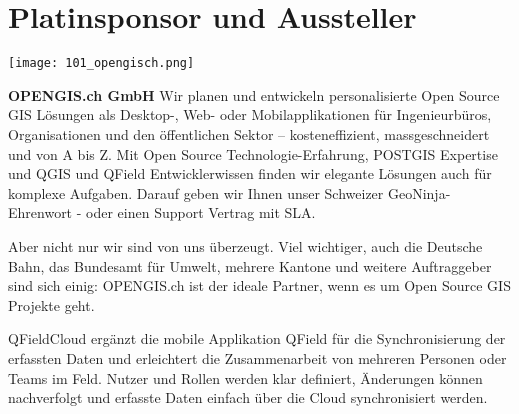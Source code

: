 \section*{Platinsponsor und Aussteller}
\begin{flushright}
\texttt{[image: 101\_opengisch.png]}
\end{flushright}
\noindent
{\bfseries OPENGIS.ch GmbH} Wir planen und entwickeln personalisierte Open Source GIS Lösungen als Desktop-, Web- oder Mobilapplikationen für Ingenieurbüros, Organisationen und den öffentlichen Sektor – kosteneffizient, massgeschneidert und von A bis Z. Mit Open Source Technologie-Erfahrung, POSTGIS Expertise und QGIS und QField Entwicklerwissen finden wir elegante Lösungen auch für komplexe Aufgaben. Darauf geben wir Ihnen unser Schweizer GeoNinja-Ehrenwort - oder einen Support Vertrag mit SLA.

\noindent
Aber nicht nur wir sind von uns überzeugt. Viel wichtiger, auch die Deutsche Bahn, das Bundesamt für Umwelt, mehrere Kantone und weitere Auftraggeber sind sich einig: OPENGIS.ch ist der ideale Partner, wenn es um Open Source GIS Projekte geht.

\noindent
QFieldCloud ergänzt die mobile Applikation QField für die Synchronisierung der erfassten Daten und erleichtert die Zusammenarbeit von mehreren Personen oder Teams im Feld. Nutzer und Rollen werden klar definiert, Änderungen können nachverfolgt und erfasste Daten einfach über die Cloud synchronisiert werden.

